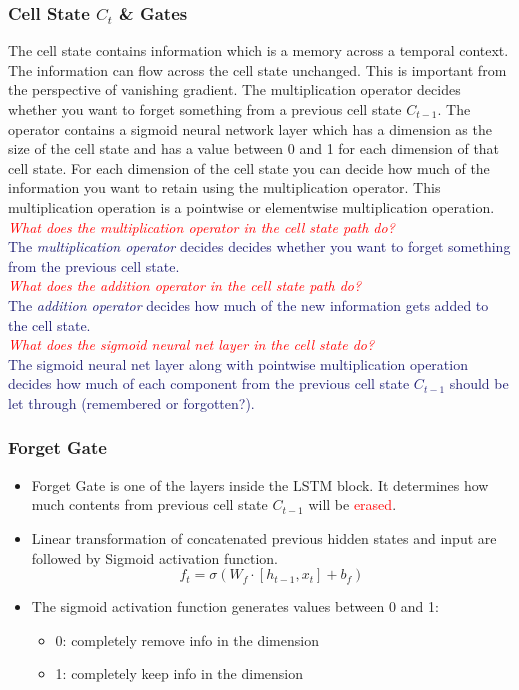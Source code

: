 \documentclass{article}
\begin{document}
\subsubsection{Cell State $C_t$ \& Gates}
The cell state contains information which is a memory across a temporal context. The information can flow across the cell state unchanged. This is important from the perspective of vanishing gradient. The multiplication operator decides whether you want to forget something from a previous cell state $C_{t-1}$. The operator contains a sigmoid neural network layer which has a dimension as the size of the cell state and has a value between 0 and 1 for each dimension of that cell state. For each dimension of the cell state you can decide how much of the information you want to retain using the multiplication operator. This multiplication operation is a pointwise or elementwise multiplication operation. \\ 
\textcolor{red}{\textit{What does the multiplication operator in the cell state path do?}}\\
\textcolor{MidnightBlue}{The \textit{multiplication operator} decides decides whether you want to forget something from the previous cell state.} \\
\textcolor{red}{\textit{What does the addition operator in the cell state path do?}}\\
\textcolor{MidnightBlue}{The \textit{addition operator} decides how much of the new information gets added to the cell state.} \\
\textcolor{red}{\textit{What does the sigmoid neural net layer in the cell state do?}}\\
\textcolor{MidnightBlue}{The sigmoid neural net layer along with pointwise multiplication operation decides how much of each component from the previous cell state $C_{t-1}$ should be let through (remembered or forgotten?). } \\
\subsubsection{Forget Gate}
\begin{itemize}
    \item Forget Gate is one of the layers inside the LSTM block. It determines how much contents from previous cell state $C_{t-1}$ will be \textcolor{red}{erased}.
    \item Linear transformation of concatenated previous hidden states and input are followed by Sigmoid activation function.
    $$ f_t = \sigma (W_f \cdot [h_{t-1}, x_t] + b_f) $$
    \item The sigmoid activation function generates values between 0 and 1:
    \begin{itemize}
        \item 0: completely remove info in the dimension
        \item 1: completely keep info in the dimension
    \end{itemize}
\end{itemize}
 
\end{document}
